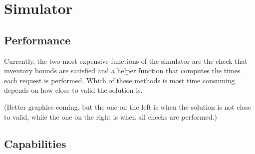 \documentclass{article}
\begin{document}
\section{Simulator}


\subsection{Performance}

Currently, the two most expensive functions of the simulator are the check that inventory bounds are satisfied and a helper function that computes the times each request is performed.
Which of these methods is most time consuming depends on how close to valid the solution is.

(Better graphics coming, but the one on the left is when the solution is not close to valid, while the one on the right is when all checks are performed.)


\subsection{Capabilities}
\end{document}

